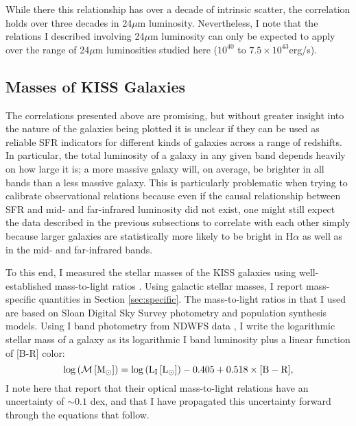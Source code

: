 While there this relationship has over a decade of intrinsic scatter, the correlation holds over three decades in 24$\mu$m luminosity. Nevertheless, I note that the relations I described involving 24$\mu$m luminosity can only be expected to apply over the range of 24$\mu$m luminosities studied here ($10^{40}$ to $7.5\times10^{43}$erg/s).




\subsection{Masses of KISS Galaxies}
\label{masses_of_kiss_galaxies}

The correlations presented above are promising, but without greater insight into the nature of the galaxies being plotted it is unclear if they can be used as reliable SFR indicators for different kinds of galaxies across a range of redshifts. In particular, the total luminosity of a galaxy in any given band depends heavily on how large it is; a more massive galaxy will, on average, be brighter in all bands than a less massive galaxy. This is particularly problematic when trying to calibrate observational relations because even if the causal relationship between SFR and mid- and far-infrared luminosity did not exist, one might still expect the data described in the previous subsections to correlate with each other simply because larger galaxies are statistically more likely to be bright in H$\alpha$ as well as in the mid- and far-infrared bands. 

To this end, I measured the stellar masses of the KISS galaxies using well-established mass-to-light ratios \citep{Bell}. Using galactic stellar masses, I report mass-specific quantities in Section \ref{sec:specific}. The mass-to-light ratios in \cite{Bell} that I used are based on Sloan Digital Sky Survey photometry and population synthesis models. Using I band photometry from NDWFS data \citep{Jannuzi}, I write the logarithmic stellar mass of a galaxy as its logarithmic I band luminosity plus a linear function of [B-R] color:
\begin{equation}
\rm{log}\left({\cal M}\left[M_\odot\right]\right) = \rm{log}\left(L_I\left[L_\odot\right]\right) -0.405 + 0.518\times[B-R],
\end{equation}
I note here that \cite{Bell} report that their optical mass-to-light relations have an uncertainty of $\sim0.1$ dex, and that I have propagated this uncertainty forward through the equations that follow.

